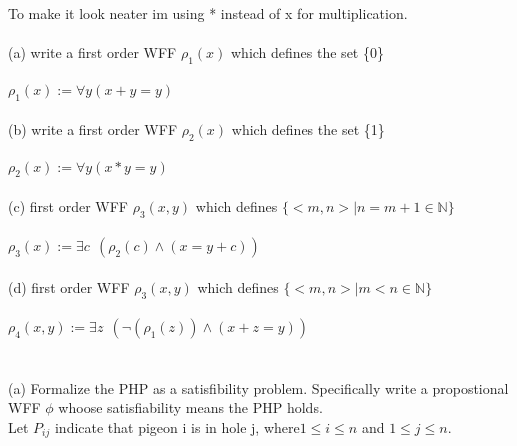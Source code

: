 \documentclass[11pt,leqno,fleqn]{article}
\begin{document}
\newpage{}
\section{}
To make it look neater im using * instead of x for multiplication.\\
\\
(a) write a first order WFF $\rho_1(x)$ which defines the set \{0\}\\
\\
$\rho_1(x) := \forall y (x + y = y) $\\
\\
(b) write a first order WFF $\rho_2(x)$ which defines the set \{1\}\\
\\
$\rho_2(x) := \forall y (x * y = y) $\\
\\
(c) first order WFF $\rho_3(x,y)$ which defines  $\{ <m,n>| n = m + 1 \in \mathbb{N}\}$\\
\\
$\rho_3(x) := \exists c \ \ (\rho_2(c) \land (x = y + c))$\\
\\
(d) first order WFF $\rho_3(x,y)$ which defines  $\{ <m,n>| m < n \in \mathbb{N}\}$\\
\\
$\rho_4(x,y) := \exists z \ \ (\neg{(\rho_1(z))}  \land (x  + z =   y))$\\

\newpage
\section{}
(a) Formalize the PHP as a satisfibility problem. Specifically write a propostional WFF $\phi$ whoose satisfiability means the PHP holds.\\
Let $P_{ij}$ indicate that pigeon i is in hole j, where$1 \leq i \leq n$ and $1 \leq j \leq n$.\\
\end{document}
